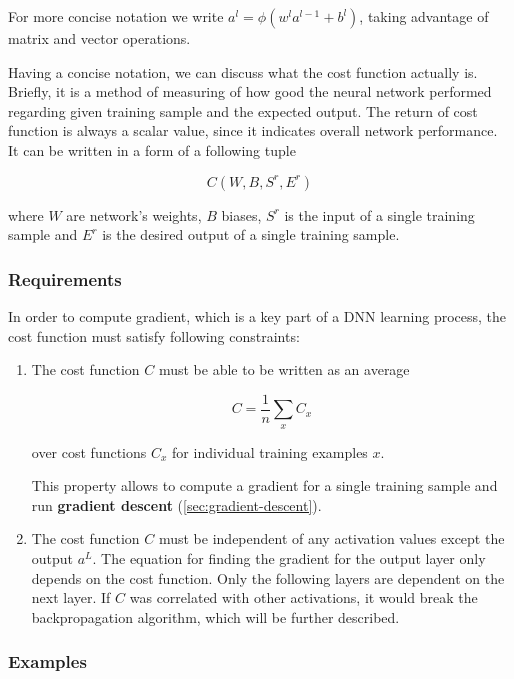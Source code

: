 \vspace{.5cm}

For more concise notation we write $a^l = \phi(w^l a^{l-1} + b^l)$, taking advantage of matrix and vector operations.

Having a concise notation, we can discuss what the cost function actually is. Briefly, it is a method of measuring of how good the neural network performed regarding given training sample and the expected output. The return of cost function is always a scalar value, since it indicates overall network performance. It can be written in a form of a following tuple

\begin{equation}
    C(W, B, S^r, E^r)
\end{equation}

where $W$ are network's weights, $B$ biases, $S^r$ is the input of a single training sample and $E^r$ is the desired output of a single training sample.

\subsubsection*{Requirements}
\label{sub2:cost-requirements}

In order to compute gradient, which is a key part of a DNN learning process, the cost function must satisfy following constraints:

\begin{enumerate}
    \item The cost function $C$ must be able to be written as an average
    
        \[C = \frac{1}{n} \sum_x C_x\]
        
        over cost functions $C_x$ for individual training examples $x$.
    
        This property allows to compute a gradient for a single training sample and run \textbf{gradient descent} (\ref{sec:gradient-descent}).
    
    \item The cost function $C$ must be independent of any activation values except the output $a^L$.
    The equation for finding the gradient for the output layer only depends on the cost function. Only the following layers are dependent on the next layer. If $C$ was correlated with other activations, it would break the backpropagation algorithm, which will be further described.
\end{enumerate}

\subsubsection*{Examples}
\label{sub2:cost-function-examples}

